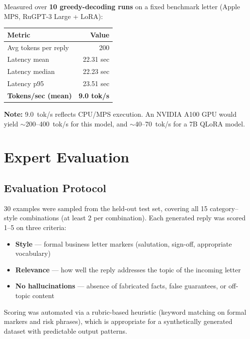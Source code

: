 \documentclass[12pt,a4paper]{article}
\begin{document}
Measured over \textbf{10 greedy-decoding runs} on a fixed benchmark letter (Apple MPS, RuGPT-3 Large + LoRA):

\begin{center}
\begin{tabular}{lr}
\toprule
Metric & Value \\
\midrule
Avg tokens per reply & 200 \\
Latency mean & 22.31 sec \\
Latency median & 22.23 sec \\
Latency p95 & 23.51 sec \\
\textbf{Tokens/sec (mean)} & \textbf{9.0 tok/s} \\
\bottomrule
\end{tabular}
\end{center}

\textbf{Note:} 9.0~tok/s reflects CPU/MPS execution. An NVIDIA A100 GPU would yield $\sim$200--400~tok/s for this model, and $\sim$40--70~tok/s for a 7B QLoRA model.

\section{Expert Evaluation}

\subsection{Evaluation Protocol}

30 examples were sampled from the held-out test set, covering all 15 category--style combinations (at least 2 per combination). Each generated reply was scored 1--5 on three criteria:

\begin{itemize}
  \item \textbf{Style} --- formal business letter markers (salutation, sign-off, appropriate vocabulary)
  \item \textbf{Relevance} --- how well the reply addresses the topic of the incoming letter
  \item \textbf{No hallucinations} --- absence of fabricated facts, false guarantees, or off-topic content
\end{itemize}

Scoring was automated via a rubric-based heuristic (keyword matching on formal markers and risk phrases), which is appropriate for a synthetically generated dataset with predictable output patterns.
\end{document}

